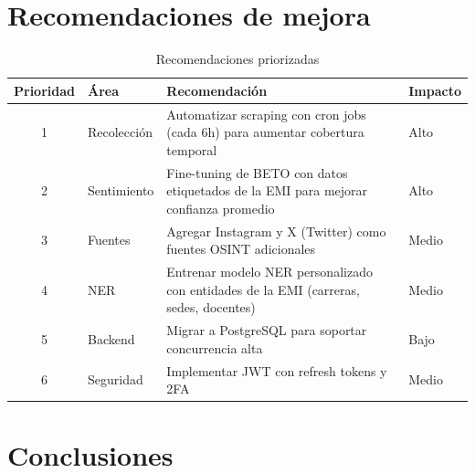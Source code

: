 \documentclass[11pt,a4paper]{article}
\begin{document}
\section{Recomendaciones de mejora}

\begin{table}[H]
\centering
\begin{tabularx}{\textwidth}{c l X l}
\toprule
\textbf{Prioridad} & \textbf{Área} & \textbf{Recomendación} & \textbf{Impacto} \\
\midrule
1 & Recolección & Automatizar scraping con cron jobs (cada 6h) para aumentar cobertura temporal & Alto \\
\rowcolor{tablerow}
2 & Sentimiento & Fine-tuning de BETO con datos etiquetados de la EMI para mejorar confianza promedio & Alto \\
3 & Fuentes & Agregar Instagram y X (Twitter) como fuentes OSINT adicionales & Medio \\
\rowcolor{tablerow}
4 & NER & Entrenar modelo NER personalizado con entidades de la EMI (carreras, sedes, docentes) & Medio \\
5 & Backend & Migrar a PostgreSQL para soportar concurrencia alta & Bajo \\
\rowcolor{tablerow}
6 & Seguridad & Implementar JWT con refresh tokens y 2FA & Medio \\
\bottomrule
\end{tabularx}
\caption{Recomendaciones priorizadas}
\end{table}

\section{Conclusiones}
\end{document}
